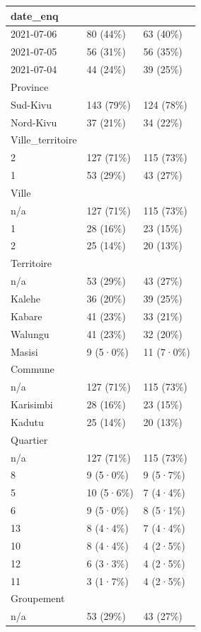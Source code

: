 \documentclass[
]{book}
\begin{document}
\begin{tabular}{l|l|l}
\hline
date\_enq &  & \\
\hline
2021-07-06 & 80 (44\%) & 63 (40\%)\\
\hline
2021-07-05 & 56 (31\%) & 56 (35\%)\\
\hline
2021-07-04 & 44 (24\%) & 39 (25\%)\\
\hline
Province &  & \\
\hline
Sud-Kivu & 143 (79\%) & 124 (78\%)\\
\hline
Nord-Kivu & 37 (21\%) & 34 (22\%)\\
\hline
Ville\_territoire &  & \\
\hline
2 & 127 (71\%) & 115 (73\%)\\
\hline
1 & 53 (29\%) & 43 (27\%)\\
\hline
Ville &  & \\
\hline
n/a & 127 (71\%) & 115 (73\%)\\
\hline
1 & 28 (16\%) & 23 (15\%)\\
\hline
2 & 25 (14\%) & 20 (13\%)\\
\hline
Territoire &  & \\
\hline
n/a & 53 (29\%) & 43 (27\%)\\
\hline
Kalehe & 36 (20\%) & 39 (25\%)\\
\hline
Kabare & 41 (23\%) & 33 (21\%)\\
\hline
Walungu & 41 (23\%) & 32 (20\%)\\
\hline
Masisi & 9 (5·0\%) & 11 (7·0\%)\\
\hline
Commune &  & \\
\hline
n/a & 127 (71\%) & 115 (73\%)\\
\hline
Karisimbi & 28 (16\%) & 23 (15\%)\\
\hline
Kadutu & 25 (14\%) & 20 (13\%)\\
\hline
Quartier &  & \\
\hline
n/a & 127 (71\%) & 115 (73\%)\\
\hline
8 & 9 (5·0\%) & 9 (5·7\%)\\
\hline
5 & 10 (5·6\%) & 7 (4·4\%)\\
\hline
6 & 9 (5·0\%) & 8 (5·1\%)\\
\hline
13 & 8 (4·4\%) & 7 (4·4\%)\\
\hline
10 & 8 (4·4\%) & 4 (2·5\%)\\
\hline
12 & 6 (3·3\%) & 4 (2·5\%)\\
\hline
11 & 3 (1·7\%) & 4 (2·5\%)\\
\hline
Groupement &  & \\
\hline
n/a & 53 (29\%) & 43 (27\%)\\

\end{tabular}
\end{document}
